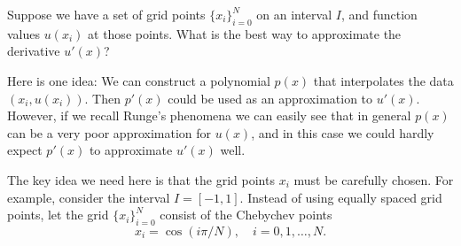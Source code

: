 \label{lab:pseudospectral1}

Suppose we have a set of grid points $\{x_i\}_{i=0}^N$ on an interval $I$, and function values $u(x_i)$ at those points.
What is the best way to approximate the derivative $u'(x)$?

Here is one idea: We can construct a polynomial $p(x)$ that interpolates the data $(x_i,u(x_i))$.
Then $p'(x)$ could be used as an approximation to $u'(x)$.
However, if we recall Runge's phenomena we can easily see that in general $p(x)$ can be a very poor approximation for $u(x)$, and in this case we could hardly expect $p'(x)$ to approximate $u'(x)$ well. 

The key idea we need here is that the grid points $x_i$ must be carefully chosen.
For example, consider the interval $I = [-1,1]$.
Instead of using equally spaced grid points, let the grid $\{x_i\}_{i=0}^N$ consist of the Chebychev points 
\[x_i = \cos (i \pi /N), \quad i = 0, 1, \ldots, N.\]
